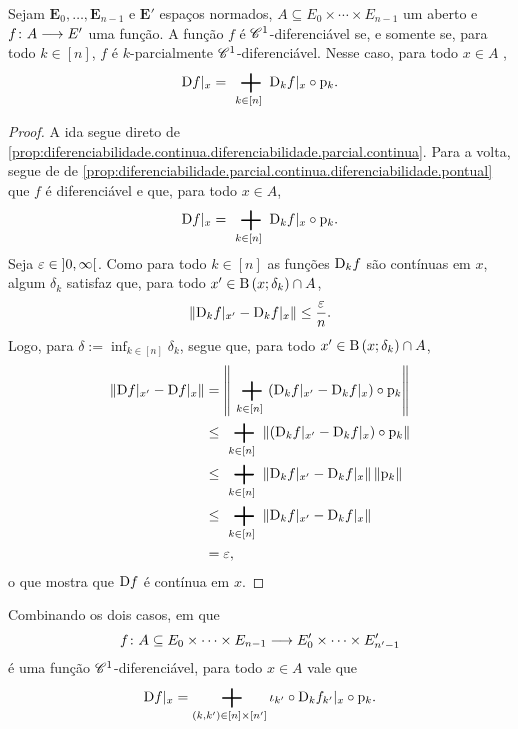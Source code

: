 \begin{proposition}
\label{prop:continuamente.diferenciavel.parcialmente}
Sejam $\bm E_0, \ldots, \bm E_{n-1}$ e $\bm E'$ espaços normados, $A \subseteq E_0 \times \cdots \times E_{n-1}$ um aberto e $f\colon \allowbreak A \longrightarrow E'$ uma função. A função $f$ é $\mathscr{C}^1$-diferenciável se, e somente se, para todo $k \in [n]$, $f$ é $k$-parcialmente $\mathscr{C}^1$-diferenciável. Nesse caso, para todo $x \in A$%
,
	\begin{equation*}
	\D f|_x = \sum_{k \in [n]} \D_k f|_x \circ \proj_k.
	\end{equation*}
\end{proposition}
\begin{proof}
A ida segue direto de \ref{prop:diferenciabilidade.continua.diferenciabilidade.parcial.continua}. Para a volta, segue de
de \ref{prop:diferenciabilidade.parcial.continua.diferenciabilidade.pontual} que $f$ é diferenciável e que, para todo $x \in A$,
	\begin{equation*}
	\D f|_x = \sum_{k \in [n]} \D_k f|_x \circ \proj_k.
	\end{equation*}
Seja $\varepsilon \in \left]0,\allowbreak \infty\right[$. Como para todo $k \in [n]$ as funções $\mathrm{D}_k f$ são contínuas em $x$, algum $\delta_k$ satisfaz que, para todo $x' \in \mathrm{B}\left(x; \delta_k\right) \cap A$,
	\begin{equation*}
	\left\Vert{\mathrm{D}_k f|_{x'} - \mathrm{D}_k f|_x}\right\Vert \leq \frac{\varepsilon}{n}.
	\end{equation*}
Logo, para $\delta := \inf_{k \in [n]} \delta_k$, segue que, para todo $x' \in \mathrm{B}\left(x; \delta_k\right) \cap A$,
	\begin{align*}
	\nor{\D f|_{x'} - \D f|_x} &= \nor{\sum_{k \in [n]} (\D_k f|_{x'} - \D_k f|_x) \circ \proj_k} \\
		&\leq \sum_{k \in [n]} \nor{(\D_k f|_{x'} - \D_k f|_x) \circ \proj_k} \\
		&\leq \sum_{k \in [n]} \nor{\D_k f|_{x'} - \D_k f|_x} \nor{\proj_k} \\
		&\leq \sum_{k \in [n]} \nor{\D_k f|_{x'} - \D_k f|_x} \\
		&= \varepsilon,
	\end{align*}
o que mostra que $\mathrm{D} f$ é contínua em $x$.
\end{proof}

Combinando os dois casos, em que
	\begin{equation*}
	f\colon \allowbreak A \subseteq E_0 \times \cdots \times E_{n-1} \longrightarrow E'_0 \times \cdots \times E'_{n'-1}
	\end{equation*}
é uma função $\mathscr{C}^1$-diferenciável, para todo $x \in A$ vale que
	\begin{equation*}
	\D f|_x = \sum_{(k,k') \in [n] \times [n']} \inclu_{k'} \circ \D_k f_{k'}|_x \circ \proj_k.
	\end{equation*}

